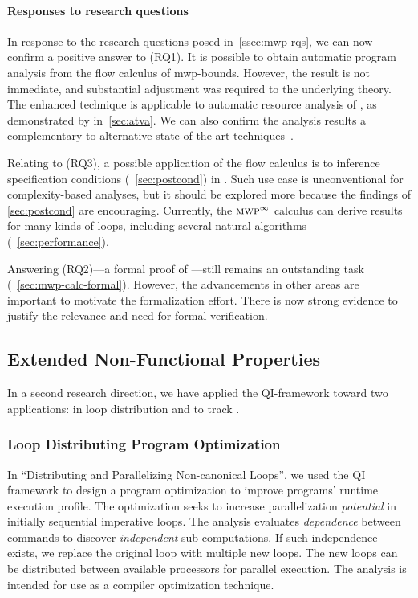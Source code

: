 \paragraph*{Responses to research questions}
In response to the research questions posed in~\autoref{ssec:mwp-rqs}, we can
now confirm a positive answer to (RQ1). It is possible to obtain automatic
program analysis from the flow calculus of mwp-bounds.
However, the result is not immediate, and substantial adjustment was required to
the underlying theory. The enhanced technique is applicable to automatic
resource analysis of , as demonstrated by 
in~\autoref{sec:atva}. We can also confirm the analysis results a complementary
to alternative state-of-the-art techniques~\cite[p. 5]{aubert2023b}.

Relating to (RQ3), a possible application of the flow calculus is to inference
specification conditions (\cf~\autoref{sec:postcond}) in
. Such use case is unconventional for complexity-based
analyses, but it should be explored more because the findings of
\autoref{sec:postcond} are encouraging. Currently, the
\(\textnormal{\textsc{mwp}}^\infty\) calculus can derive results for many kinds of
loops, including several natural algorithms (\cf~\autoref{sec:performance}).

Answering (RQ2)---a formal proof of ---still remains an
outstanding task (\cf~\autoref{sec:mwp-calc-formal}). However, the advancements
in other areas are important to motivate the formalization effort. There is now
strong evidence to justify the relevance and need for formal verification.

\subsection{Extended Non-Functional Properties}
\label{subsec:res-qi}

In a second research direction, we have applied the QI-framework toward two
applications: in loop distribution and
to track .

\subsubsection{Loop Distributing Program Optimization}
\label{subsubsec:qi-opt}

In \enquote{Distributing and Parallelizing Non-canonical Loops},
we used the QI framework to design a program optimization to improve programs' runtime execution profile.
The optimization seeks to increase parallelization \emph{potential} in initially sequential imperative loops.
The analysis evaluates \emph{dependence} between commands to discover \emph{independent} sub-computations.
If such independence exists, we replace the original loop with multiple new loops.
The new loops can be distributed between available processors for parallel execution.
The analysis is intended for use as a compiler optimization technique.

